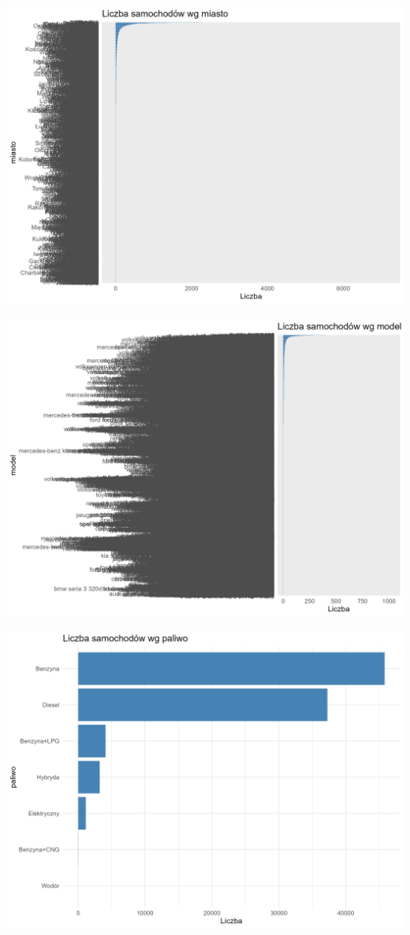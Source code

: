 \documentclass[
]{article}
\begin{document}
\includegraphics[width=1\linewidth]{analiza/wykres_miasto}

\includegraphics[width=1\linewidth]{analiza/wykres_model}

\includegraphics[width=1\linewidth]{analiza/wykres_paliwo}
\end{document}
